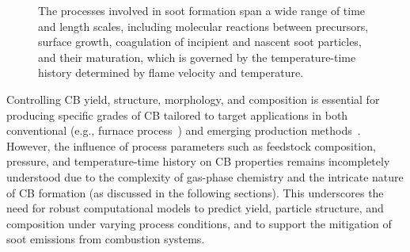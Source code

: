 \begin{figure}[H]
	\centering
	\caption{The processes involved in soot formation span a wide range of time and length scales, including molecular reactions between precursors, surface growth, coagulation of incipient and nascent soot particles, and their maturation, which is governed by the temperature-time history determined by flame velocity and temperature.}
	\label{fig:sootscales}
\end{figure}



Controlling CB yield, structure, morphology, and composition is essential for producing specific grades of CB tailored to target applications in both conventional (e.g., furnace process~\citep{dames2023plasma}) and emerging production methods~\citep{li2017experimental, fulcheri2023energy, patlolla2023review}. However, the influence of process parameters such as feedstock composition, pressure, and temperature-time history on CB properties remains incompletely understood due to the complexity of gas-phase chemistry and the intricate nature of CB formation (as discussed in the following sections). This underscores the need for robust computational models to predict yield, particle structure, and composition under varying process conditions, and to support the mitigation of soot emissions from combustion systems.


